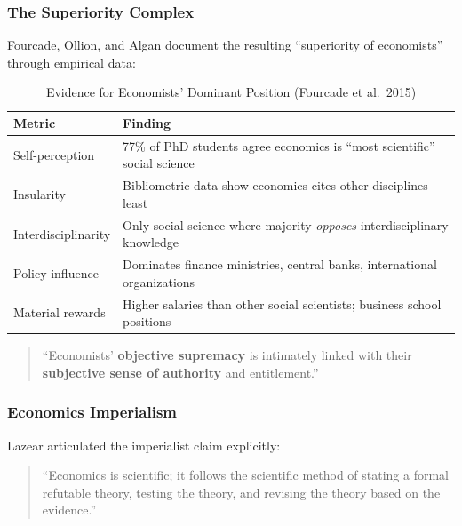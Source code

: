 \subsubsection{The Superiority Complex}

Fourcade, Ollion, and Algan \citep{fourcade2015superiority} document the resulting
``superiority of economists'' through empirical data:

\begin{table}[htbp]
\centering
\caption{Evidence for Economists' Dominant Position (Fourcade et al.\ 2015)}
\label{tab:superiority-evidence}
\renewcommand{\arraystretch}{1.3}
\small
\begin{tabular}{@{}lp{8cm}@{}}
\toprule
\textbf{Metric} & \textbf{Finding} \\
\midrule
Self-perception & 77\% of PhD students agree economics is ``most scientific'' social science \\
Insularity & Bibliometric data show economics cites other disciplines least \\
Interdisciplinarity & Only social science where majority \textit{opposes} interdisciplinary knowledge \\
Policy influence & Dominates finance ministries, central banks, international organizations \\
Material rewards & Higher salaries than other social scientists; business school positions \\
\bottomrule
\end{tabular}
\end{table}

\begin{quote}
``Economists' \textbf{objective supremacy} is intimately linked with their
\textbf{subjective sense of authority} and entitlement.'' \citep{fourcade2015superiority}
\end{quote}

\subsubsection{Economics Imperialism}

Lazear \citep{lazear2000economic} articulated the imperialist claim explicitly:

\begin{quote}
``Economics is scientific; it follows the scientific method of stating a formal
refutable theory, testing the theory, and revising the theory based on the evidence.''
\end{quote}

